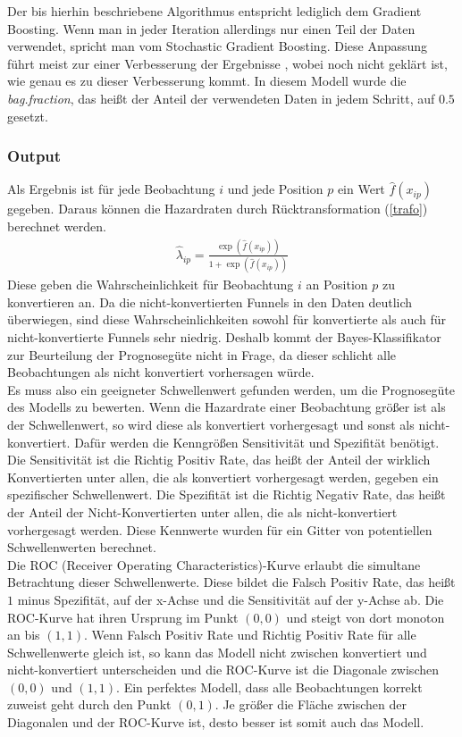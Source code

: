 Der bis hierhin beschriebene Algorithmus entspricht lediglich dem Gradient Boosting. Wenn man in jeder Iteration allerdings nur einen Teil der Daten verwendet, spricht man vom Stochastic Gradient Boosting. Diese Anpassung führt meist zur einer Verbesserung der Ergebnisse \cite{fried_additive}, wobei noch nicht geklärt ist, wie genau es zu dieser Verbesserung kommt. In diesem Modell wurde die \textit{bag.fraction}, das heißt der Anteil der verwendeten Daten in jedem Schritt, auf $0.5$ gesetzt.

\subsubsection*{Output}

Als Ergebnis ist für jede Beobachtung $i$ und jede Position $p$ ein Wert $\hat{f}(x_{ip})$ gegeben. Daraus können die Hazardraten durch Rücktransformation (\ref{trafo}) berechnet werden.
\begin{align}
	\hat{\lambda}_{ip} = \frac{\exp(\hat{f}(x_{ip}))}{1+\exp(\hat{f}(x_{ip}))} \label{trafo}
\end{align}
Diese geben die Wahrscheinlichkeit für Beobachtung $i$ an Position $p$ zu konvertieren an. Da die nicht-konvertierten Funnels in den Daten deutlich überwiegen, sind diese Wahrscheinlichkeiten sowohl für konvertierte als auch für nicht-konvertierte Funnels sehr niedrig. Deshalb kommt der Bayes-Klassifikator zur Beurteilung der Prognosegüte nicht in Frage, da dieser schlicht alle Beobachtungen als nicht konvertiert vorhersagen würde.\\
Es muss also ein geeigneter Schwellenwert gefunden werden, um die Prognosegüte des Modells zu bewerten. Wenn die Hazardrate einer Beobachtung größer ist als der Schwellenwert, so wird diese als konvertiert vorhergesagt und sonst als nicht-konvertiert. Dafür werden die Kenngrößen Sensitivität und Spezifität benötigt. Die Sensitivität ist die Richtig Positiv Rate, das heißt der Anteil der wirklich Konvertierten unter allen, die als konvertiert vorhergesagt werden, gegeben ein spezifischer Schwellenwert. Die Spezifität ist die Richtig Negativ Rate, das heißt der Anteil der Nicht-Konvertierten unter allen, die als nicht-konvertiert vorhergesagt werden. Diese Kennwerte wurden für ein Gitter von potentiellen Schwellenwerten berechnet.\\
Die ROC (Receiver Operating Characteristics)-Kurve erlaubt die simultane Betrachtung dieser Schwellenwerte. Diese bildet die Falsch Positiv Rate, das heißt $1$ minus Spezifität, auf der x-Achse und die Sensitivität auf der y-Achse ab. Die ROC-Kurve hat ihren Ursprung im Punkt $(0,0)$ und steigt von dort monoton an bis $(1,1)$. Wenn Falsch Positiv Rate und Richtig Positiv Rate für alle Schwellenwerte gleich ist, so kann das Modell nicht zwischen konvertiert und nicht-konvertiert unterscheiden und die ROC-Kurve ist die Diagonale zwischen $(0,0)$ und $(1,1)$. Ein perfektes Modell, dass alle Beobachtungen korrekt zuweist geht durch den Punkt $(0,1)$. Je größer die Fläche zwischen der Diagonalen und der ROC-Kurve ist, desto besser ist somit auch das Modell.\\
